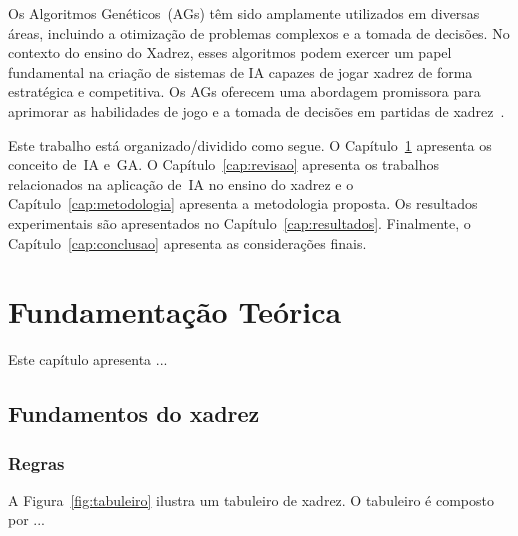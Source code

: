 \documentclass[12pt,oneside,a4paper,chapter=TITLE,section=TITLE,sumario
=tradicional]{abntex2}
\begin{document}
Os Algoritmos Genéticos~(AGs) têm sido amplamente utilizados em diversas áreas, incluindo a otimização de problemas complexos e a tomada de decisões. No contexto do ensino do Xadrez, esses algoritmos podem exercer um papel fundamental na criação de sistemas de IA capazes de jogar xadrez de forma estratégica e competitiva. Os AGs oferecem uma abordagem promissora para aprimorar as habilidades de jogo e a tomada de decisões em partidas de xadrez~\cite{autor3}. 


Este trabalho está organizado/dividido como segue. O Capítulo~\ref{cap:fundamentacao} apresenta os conceito de~IA e~GA. O Capítulo~\ref{cap:revisao} apresenta os trabalhos relacionados na aplicação de~IA no ensino do xadrez e o Capítulo~\ref{cap:metodologia} apresenta a metodologia proposta. Os resultados experimentais são apresentados no Capítulo~\ref{cap:resultados}. Finalmente, o Capítulo~\ref{cap:conclusao} apresenta as considerações finais.


\chapter{Fundamentação Teórica}
\label{cap:fundamentacao}

Este capítulo apresenta ... 

\section{Fundamentos do xadrez}



\subsection{Regras}



A Figura~\ref{fig:tabuleiro} ilustra um tabuleiro de xadrez. O tabuleiro é composto por ...

\begin{figure}[!htb]
    
    \fonteautor
\end{figure}
\end{document}
